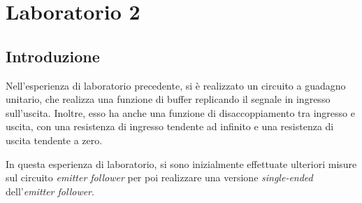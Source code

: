 \chapter{Laboratorio 2}
\section{Introduzione}
Nell'esperienza di laboratorio precedente, si è realizzato un circuito a guadagno unitario, che realizza una funzione di buffer replicando il segnale in ingresso sull'uscita. Inoltre, esso ha anche una funzione di disaccoppiamento tra ingresso e uscita, con una resistenza di ingresso tendente ad infinito e una resistenza di uscita tendente a zero. 

In questa esperienza di laboratorio, si sono inizialmente effettuate ulteriori misure sul circuito \textit{emitter follower} per poi realizzare una versione \textit{single-ended} dell'\textit{emitter follower}.

